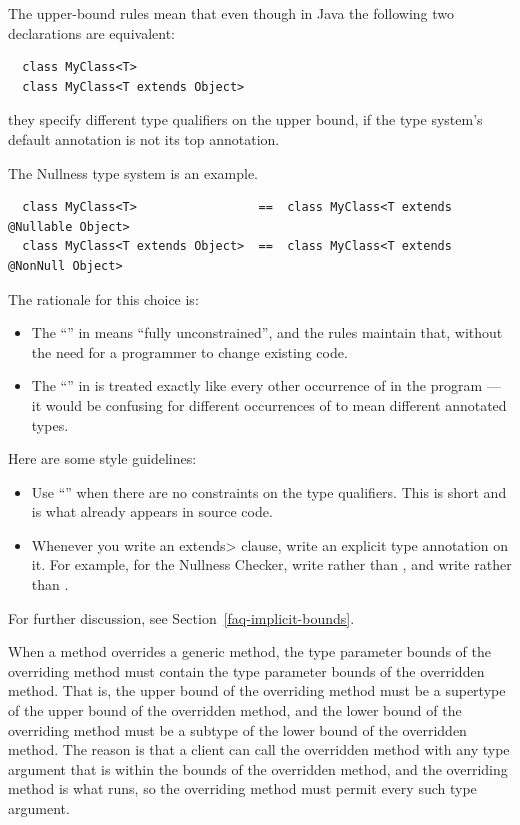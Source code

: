 The upper-bound rules mean that even though in Java the following two
declarations are equivalent:

\begin{Verbatim}
  class MyClass<T>
  class MyClass<T extends Object>
\end{Verbatim}

\noindent
they specify different type qualifiers on the upper bound,
if the type system's default annotation is not its top annotation.

The Nullness type system is an example.

\begin{Verbatim}
  class MyClass<T>                 ==  class MyClass<T extends @Nullable Object>
  class MyClass<T extends Object>  ==  class MyClass<T extends @NonNull Object>
\end{Verbatim}

The rationale for this choice is:
\begin{itemize}
\item
  The ``'' in  means ``fully unconstrained'',
  and the rules maintain that, without the need for a programmer to
  change existing code.
\item
  The ``'' in  is treated
  exactly like every other occurrence of  in the program ---
  it would be confusing for different occurrences of  to mean
  different annotated types.
\end{itemize}

Here are some style guidelines:
\begin{itemize}
\item
  Use ``'' when there are no constraints on the type qualifiers.
  This is short and is what already appears in source code.
\item
  Whenever you write an \<extends> clause, write an explicit type
  annotation on it.  For example, for the Nullness Checker, write
   rather than , and write  rather than .
\end{itemize}

For further discussion, see Section~\ref{faq-implicit-bounds}.



When a method overrides a generic method, the type parameter bounds of the
overriding method must contain the type parameter bounds of the overridden
method.  That is, the upper bound of the overriding method must be a supertype
of the upper bound of the overridden method, and the lower bound of the
overriding method must be a subtype of the lower bound of the overridden
method.  The reason is that a client can call the overridden method with any
type argument that is within the bounds of the overridden method, and the
overriding method is what runs, so the overriding method must permit every such
type argument.

